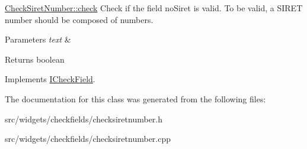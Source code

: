 \hyperlink{classCheckSiretNumber_aaf0a1411e380789062564bd992e72c1b}{Check\+Siret\+Number\+::check} Check if the field no\+Siret is valid. To be valid, a S\+I\+R\+E\+T number should be composed of numbers. 


\begin{DoxyParams}{Parameters}
{\em text} & \\
\hline
\end{DoxyParams}
\begin{DoxyReturn}{Returns}
boolean 
\end{DoxyReturn}


Implements \hyperlink{classICheckField_a6bd42b4d49c165cdd92822135123fd4b}{I\+Check\+Field}.



The documentation for this class was generated from the following files\+:\begin{DoxyCompactItemize}
\item 
src/widgets/checkfields/checksiretnumber.\+h\item 
src/widgets/checkfields/checksiretnumber.\+cpp\end{DoxyCompactItemize}
